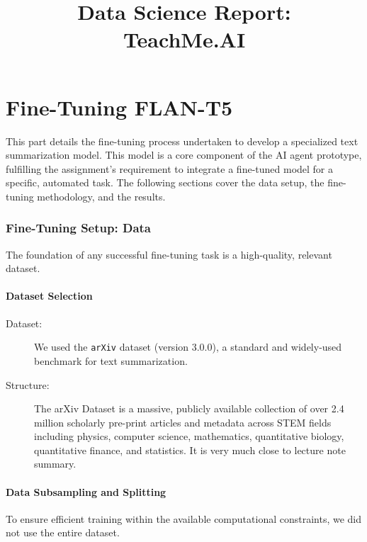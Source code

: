 \documentclass[12pt,a4paper]{article}
\title{Data Science Report: \protect\\ TeachMe.AI}%
\author{}
\date{}
\begin{document}
\maketitle
\vspace{-4em} %

\part{Fine-Tuning FLAN-T5}

This part details the fine-tuning process undertaken to develop a specialized text summarization model. This model is a core component of the AI agent prototype, fulfilling the assignment's requirement to integrate a fine-tuned model for a specific, automated task. The following sections cover the data setup, the fine-tuning methodology, and the results.

\section{Fine-Tuning Setup: Data}

The foundation of any successful fine-tuning task is a high-quality, relevant dataset.

\subsection{Dataset Selection}
\begin{description}
    \item[Dataset:] We used the \texttt{arXiv} dataset (version 3.0.0), a standard and widely-used benchmark for text summarization.
    \item[Structure:] The arXiv Dataset is a massive, publicly available collection of over 2.4 million scholarly pre-print articles and metadata across STEM fields including physics, computer science, mathematics, quantitative biology, quantitative finance, and statistics. It is very much close to lecture note summary.
\end{description}

\subsection{Data Subsampling and Splitting}
To ensure efficient training within the available computational constraints, we did not use the entire dataset.
\end{document}

